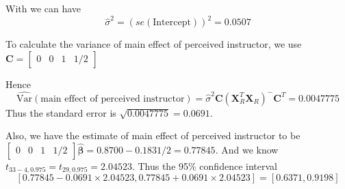 \documentclass{article}
\begin{document}
\begin{enumerate}[leftmargin = 0 em, label = \arabic*., font = \bfseries]
\begin{enumerate}
		With we can have 
		\[\hat{\sigma}^2 = (se(\mathrm{Intercept}))^2 = 0.0507\]

		To calculate the variance of main effect of perceived instructor, we use $\bm C = \begin{bmatrix}
			0 & 0 & 1 & 1/2
		\end{bmatrix}$

		Hence 
		\[\hat{\mathrm{Var}}(\textrm{main effect of perceived instructor}) = \hat{\sigma}^2 \bm C (\bm X_{R}^T \bm X_{R})^{-} \bm C^T = 0.0047775\]
		Thus the standard error is $\sqrt{0.0047775} = 0.0691$.

		Also, we have the estimate of main effect of perceived instructor to be $\begin{bmatrix}
			0 & 0 & 1 & 1/2
		\end{bmatrix} \hat{\bm \beta} = 0.8700 - 0.1831/2 = 0.77845.$ And we know $t_{33 - 4 ,0.975} = t_{29, 0.975} = 2.04523 $. Thus the 95\% confidence interval
		\[[0.77845 - 0.0691 \times 2.04523, 0.77845 + 0.0691\times 2.04523] = [0.6371, 0.9198]\]

	\end{enumerate}
	
	
	
	


 	\end{enumerate}


	
	
	
	
\end{document}
